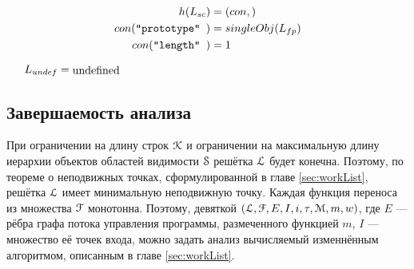 \[
\begin{aligned}
  h(L_{sc})  &= (con, ) \\ 
  con( \mbox{\texttt{``prototype''   }})   &= singleObj( L_{fp} ) \\
  con( \mbox{\texttt{``length''   }})   &= 1 \\
\end{aligned}
\]



\[
L_{undef} = \mpb{10cm}{undefined}
\]

\subsection{Завершаемость анализа}%
\label{sec:termination}
При ограничении на длину строк $\EuScript{K}$ и ограничении на
максимальную длину иерархии объектов областей видимости $\EuScript{S}$
решётка $\EuScript{L}$ будет конечна. Поэтому, по теореме о
неподвижных точках, сформулированной в главе
\ref{sec:workList}, решётка $\EuScript{L}$ имеет минимальную
неподвижную точку. Каждая функция переноса из множества $\EuScript{F}$
монотонна. Поэтому, девяткой $(\EuScript{L}, \EuScript{F}, E, I, i,
\tau, \EuScript{M}, m, w)$, где $E$ --- рёбра графа потока управления
программы, размеченного функцией $m$, $I$ --- множество её точек
входа, можно задать анализ вычисляемый изменнённым алгоритмом,
описанным в главе \ref{sec:workList}.


